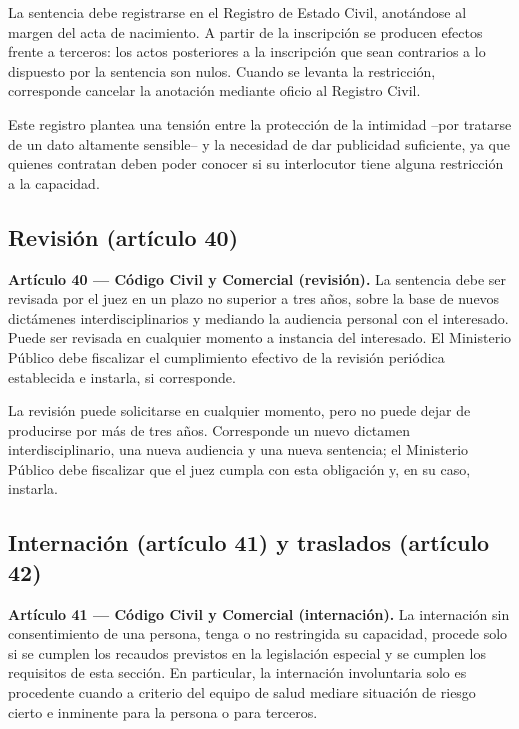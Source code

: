 \documentclass[12pt,oneside]{book}
\begin{document}
La sentencia debe registrarse en el Registro de Estado Civil, anotándose al margen del acta de nacimiento. A partir de la inscripción se producen efectos frente a terceros: los actos posteriores a la inscripción que sean contrarios a lo dispuesto por la sentencia son nulos. Cuando se levanta la restricción, corresponde cancelar la anotación mediante oficio al Registro Civil.

Este registro plantea una tensión entre la protección de la intimidad --por tratarse de un dato altamente sensible-- y la necesidad de dar publicidad suficiente, ya que quienes contratan deben poder conocer si su interlocutor tiene alguna restricción a la capacidad.

\subsection{Revisión (artículo 40)}

\begin{important}
\textbf{Artículo 40 --- Código Civil y Comercial (revisión).} La sentencia debe ser revisada por el juez en un plazo no superior a tres años, sobre la base de nuevos dictámenes interdisciplinarios y mediando la audiencia personal con el interesado. Puede ser revisada en cualquier momento a instancia del interesado. El Ministerio Público debe fiscalizar el cumplimiento efectivo de la revisión periódica establecida e instarla, si corresponde.
\end{important}

La revisión puede solicitarse en cualquier momento, pero no puede dejar de producirse por más de tres años. Corresponde un nuevo dictamen interdisciplinario, una nueva audiencia y una nueva sentencia; el Ministerio Público debe fiscalizar que el juez cumpla con esta obligación y, en su caso, instarla.

\subsection{Internación (artículo 41) y traslados (artículo 42)}

\begin{important}
\textbf{Artículo 41 --- Código Civil y Comercial (internación).} La internación sin consentimiento de una persona, tenga o no restringida su capacidad, procede solo si se cumplen los recaudos previstos en la legislación especial y se cumplen los requisitos de esta sección. En particular, la internación involuntaria solo es procedente cuando a criterio del equipo de salud mediare situación de riesgo cierto e inminente para la persona o para terceros.
\end{important}
\end{document}
